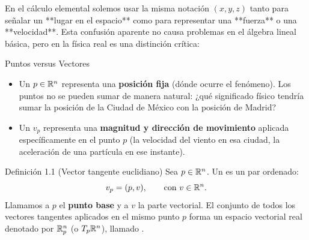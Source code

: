 \documentclass[11pt,letterpaper]{article}
\begin{document}
\setlength{\abovedisplayskip}{6pt}
\setlength{\belowdisplayskip}{6pt}
\setlength{\textfloatsep}{10pt}
\setlength{\intextsep}{8pt}
\color{blackmain}



En el cálculo elemental solemos usar la misma notación $(x, y, z)$ tanto para señalar un **lugar en el espacio** como para representar una **fuerza** o una **velocidad**. Esta confusión aparente no causa problemas en el álgebra lineal básica, pero en la física real es una distinción crítica:

\begin{intuitionbox}{Puntos versus Vectores}
\begin{itemize}
    \item Un  $p \in \mathbb{R}^n$ representa una \textbf{posición fija} (dónde ocurre el fenómeno). Los puntos no se pueden sumar de manera natural: ¿qué significado físico tendría sumar la posición de la Ciudad de México con la posición de Madrid?
    \item Un  $v_p$ representa una \textbf{magnitud y dirección de movimiento} aplicada específicamente en el punto $p$ (la velocidad del viento en esa ciudad, la aceleración de una partícula en ese instante).
\end{itemize}
\end{intuitionbox}

\begin{infobox}[orangeacc]{Definición 1.1 (Vector tangente euclidiano)}
Sea $p \in \mathbb{R}^n$. Un  es un par ordenado:
\[
v_p = (p, v), \qquad \text{con } v \in \mathbb{R}^n.
\]
Llamamos a $p$ el \textbf{punto base} y a $v$ la parte vectorial. El conjunto de todos los vectores tangentes aplicados en el mismo punto $p$ forma un espacio vectorial real denotado por $\mathbb{R}^n_p$ (o $T_p\mathbb{R}^n$), llamado .
\end{infobox}
\end{document}
